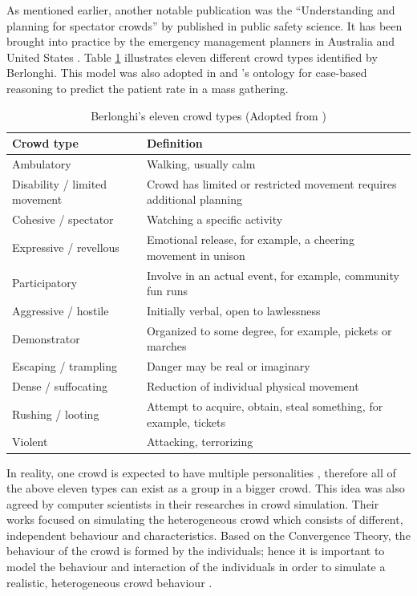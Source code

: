 As mentioned earlier, another notable publication was the ``Understanding and planning for spectator crowds'' by \textcite{Berlonghi1995} published in public safety science. It has been brought into practice by the emergency management planners in Australia \parencite{EMA1999} and United States \parencite{FEMA2005}. Table \ref{table:berlonghiCrowdType} illustrates eleven different crowd types identified by Berlonghi. This model was also adopted in \textcite{DelirHaghighi2013a} and \textcite{Arbon2007}’s ontology for case-based reasoning to predict the patient rate in a mass gathering.

\begin{table}
	\caption{Berlonghi's eleven crowd types (Adopted from \textcite{Zeitz2009})}
	\label{table:berlonghiCrowdType}
	\centering
	\begin{tabular}{|l|p{8cm}|}
		\hline
		\textbf{Crowd type} & \textbf{Definition} \\ \hline \hline
		Ambulatory & Walking, usually calm  \\ \hline
		Disability / limited movement & Crowd has limited or restricted movement requires additional planning \\ \hline
		Cohesive / spectator & Watching a specific activity \\ \hline
		Expressive / revellous & Emotional release, for example, a cheering movement in unison \\ \hline
		Participatory & Involve in an actual event, for example, community fun runs \\ \hline
		Aggressive / hostile & Initially verbal, open to lawlessness \\ \hline
		Demonstrator & Organized to some degree, for example, pickets or marches \\ \hline
		Escaping / trampling & Danger may be real or imaginary \\ \hline
		Dense / suffocating & Reduction of individual physical movement \\ \hline
		Rushing / looting & Attempt to acquire, obtain, steal something, for example, tickets \\ \hline
		Violent & Attacking, terrorizing \\ \hline
	\end{tabular}
\end{table}

In reality, one crowd is expected to have multiple personalities \parencite{Berlonghi1995}, therefore all of the above eleven types can exist as a group in a bigger crowd. This idea was also agreed by computer scientists in their researches in crowd simulation. Their works focused on simulating the heterogeneous crowd which consists of different, independent behaviour and characteristics. Based on the Convergence Theory, the behaviour of the crowd is formed by the individuals; hence it is important to model the behaviour and interaction of the individuals in order to simulate a realistic, heterogeneous crowd behaviour \parencite{Guy2011}.

